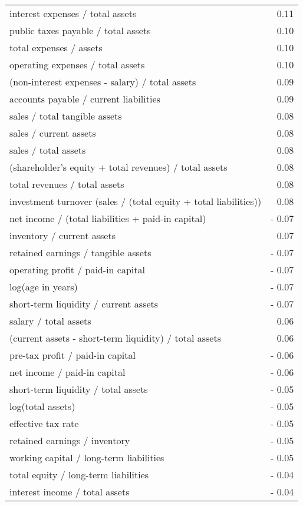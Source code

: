 \begin{longtable}{l|r}
    interest expenses / total assets & 0.11  \\
    public taxes payable / total assets & 0.10  \\
    total expenses / assets & 0.10  \\
    operating expenses / total assets & 0.10  \\
    (non-interest expenses - salary) / total assets & 0.09  \\
    accounts payable / current liabilities & 0.09  \\
    sales / total tangible assets & 0.08  \\
    sales / current assets & 0.08  \\
    sales / total assets & 0.08  \\
    (shareholder’s equity + total revenues) / total assets & 0.08  \\
    total revenues / total assets & 0.08  \\
    investment turnover (sales / (total equity + total liabilities)) & 0.08  \\
    net income / (total liabilities + paid-in capital) & - 0.07  \\
    inventory / current assets & 0.07  \\
    retained earnings / tangible assets & - 0.07  \\
    operating profit / paid-in capital & - 0.07  \\
    log(age in years) & - 0.07  \\
    short-term liquidity / current assets & - 0.07  \\
    salary / total assets & 0.06  \\
    (current assets - short-term liquidity) / total assets & 0.06  \\
    pre-tax profit / paid-in capital & - 0.06  \\
    net income / paid-in capital & - 0.06  \\
    short-term liquidity / total assets & - 0.05  \\
    log(total assets) & - 0.05  \\
    effective tax rate & - 0.05  \\
    retained earnings / inventory & - 0.05  \\
    working capital / long-term liabilities & - 0.05  \\
    total equity / long-term liabilities & - 0.04  \\
    interest income / total assets & - 0.04  \\

\end{longtable}
